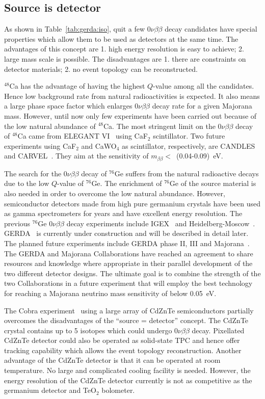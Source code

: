 \subsection{Source is detector}
\label{sec:gerda:sed}
As shown in Table~\ref{tab:gerda:iso}, quit a few $0\nu\beta\beta$ decay candidates have special properties which allow them to be used as detectors at the same time. The advantages of this concept are 1. high energy resolution is easy to achieve; 2. large mass scale is possible. The disadvantages are 1. there are constraints on detector materials; 2. no event topology can be reconstructed.

$^{48}$Ca has the advantage of having the highest $Q$-value among all the candidates. Hence low background rate from natural radioactivities is expected. It also means a large phase space factor which enlarges $0\nu\beta\beta$ decay rate for a given Majorana mass. However, until now only few experiments have been carried out because of the low natural abundance of $^{48}$Ca. The most stringent limit on the $0\nu\beta\beta$ decay of $^{48}$Ca came from ELEGANT VI~\cite{Oga04} using CaF$_{2}$ scintillator. Two future experiments using CaF$_{2}$ and CaWO$_{4}$ as scintillator, respectively, are CANDLES~\cite{Ume06} and CARVEL~\cite{Zde05}. They aim at the sensitivity of $m_{\beta\beta} <$~(0.04-0.09)~eV.

The search for the $0\nu\beta\beta$ decay of $^{76}$Ge suffers from the natural radioactive decays due to the low $Q$-value of $^{76}$Ge. The enrichment of $^{76}$Ge of the source material is also needed in order to overcome the low natural abundance. However, semiconductor detectors made from high pure germanium crystals have been used as gamma spectrometers for years and have excellent energy resolution. The previous $^{76}$Ge $0\nu\beta\beta$ decay experiments include IGEX~\cite{Aal02} and Heidelberg-Moscow~\cite{Hei04}. GERDA~\cite{Sch05} is currently under construction and will be described in detail later. The planned future experiments include GERDA phase II, III and Majorana~\cite{Gai03, Aal04}. The GERDA and Majorana Collaborations have reached an agreement to share resources and knowledge where appropriate in their parallel development of the two different detector designs. The ultimate goal is to combine the strength of the two Collaborations in a future experiment that will employ the best technology for reaching a Majorana neutrino mass sensitivity of below 0.05~eV.

The Cobra experiment~\cite{Zub01, Ell02, Kie03} using a large array of CdZnTe semiconductors partially overcomes the disadvantages of the ``source = detector'' concept. The CdZnTe crystal contains up to 5 isotopes which could undergo $0\nu\beta\beta$ decay. Pixellated CdZnTe detector could also be operated as solid-state TPC and hence offer tracking capability which allows the event topology reconstruction. Another advantage of the CdZnTe detector is that it can be operated at room temperature. No large and complicated cooling facility is needed. However, the energy resolution of the CdZnTe detector currently is not as competitive as the germanium detector and TeO$_{2}$ bolometer.

